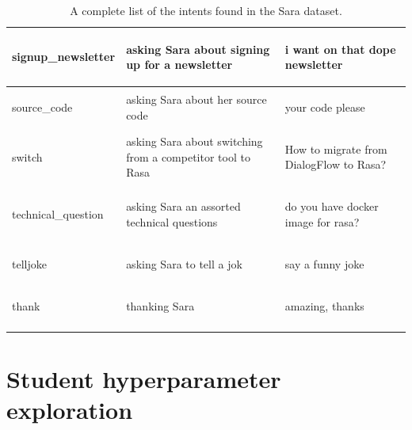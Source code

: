 \documentclass[bsc,frontabs,singlespacing,parskip,deptreport]{infthesis}
\begin{document}
{\begin{center}
\begin{longtable}{p{}|p{}|p{}}
    \hline
    \begin{spverbatim}signup_newsletter\end{spverbatim} & asking Sara about signing up for a newsletter & \begin{spverbatim}i want on that dope newsletter\end{spverbatim} \\
    \hline
    \begin{spverbatim}source_code\end{spverbatim} & asking Sara about her source code & \begin{spverbatim}your code please\end{spverbatim} \\
    \hline
    \begin{spverbatim}switch\end{spverbatim} & asking Sara about switching from a competitor tool to Rasa & \begin{spverbatim}How to migrate from DialogFlow to Rasa?\end{spverbatim} \\
    \hline
    \begin{spverbatim}technical_question\end{spverbatim} & asking Sara an assorted technical questions & \begin{spverbatim}do you have docker image for rasa?\end{spverbatim} \\
    \hline
    \begin{spverbatim}telljoke\end{spverbatim} & asking Sara to tell a jok & \begin{spverbatim}say a funny joke\end{spverbatim} \\
    \hline
    \begin{spverbatim}thank\end{spverbatim} & thanking Sara & \begin{spverbatim}amazing, thanks\end{spverbatim} \\
    \hline
    \caption{A complete list of the intents found in the Sara dataset.}
    \label{tab:sara-intent-list}
    \end{longtable}
  \end{center}
}

\chapter{Student hyperparameter exploration}{
  \label{chap:A-student-training}
  
}
\end{document}
